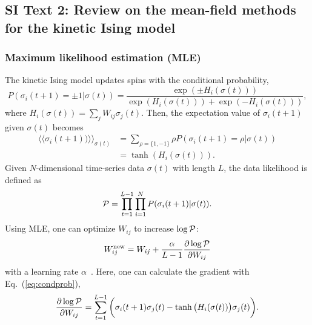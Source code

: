 \documentclass[prx,twocolumn,twoside,showpacs,superscriptaddress]{revtex4-1}
\begin{document}
\bigskip
\subsection*{SI Text 2: Review on the mean-field methods for the kinetic Ising model}

\subsubsection*{Maximum likelihood estimation (MLE)}
The kinetic Ising model updates spins with the conditional probability,
\begin{equation}
\label{eq:condprob}
P(\sigma_i(t+1)=\pm 1|\sigma(t)) = \frac{\exp(\pm H_i(\sigma(t)))}{\exp(H_i(\sigma(t))) + \exp(-H_i(\sigma(t)))},
\end{equation}
where $H_i(\sigma(t)) = \sum_j W_{ij} \sigma_j(t)$. Then, the expectation value of $\sigma_i(t+1)$ given $\sigma(t)$ becomes
\begin{align}
\langle \langle \sigma_i(t+1)) \rangle \rangle_{\sigma(t)} &= \sum_{\rho = \{1, -1\}} \rho P(\sigma_i(t+1)=\rho|\sigma(t)) \nonumber \\
&= \tanh (H_i(\sigma(t))).
\end{align}
Given $N$-dimensional time-series data $\sigma(t)$ with length $L$, the data likelihood is defined as
\begin{equation}
{\cal{P}} = \prod_{t=1}^{L-1}\prod_{i=1}^{N} P(\sigma_i(t+1)|\sigma(t)).
\end{equation}
Using MLE, one can optimize $W_{ij}$ to increase $\log \cal{P}$:
\begin{equation}
W_{ij}^{\textrm{new}} = W_{ij} + \frac{\alpha}{L-1} \frac{\partial \log {\cal{P}} }{\partial W_{ij}}
\end{equation}
with a learning rate $\alpha$~\cite{Zeng2013}. 
Here, one can calculate the gradient with Eq.~(\ref{eq:condprob}),
\begin{equation}
\label{eq:gradient}
\frac{\partial \log {\cal{P}} }{\partial W_{ij}} = \sum_{t=1}^{L-1} \bigg( \sigma_i(t+1) \sigma_j(t) - \tanh \big(H_i(\sigma(t)) \big) \sigma_j(t) \bigg).
\end{equation}
\end{document}

